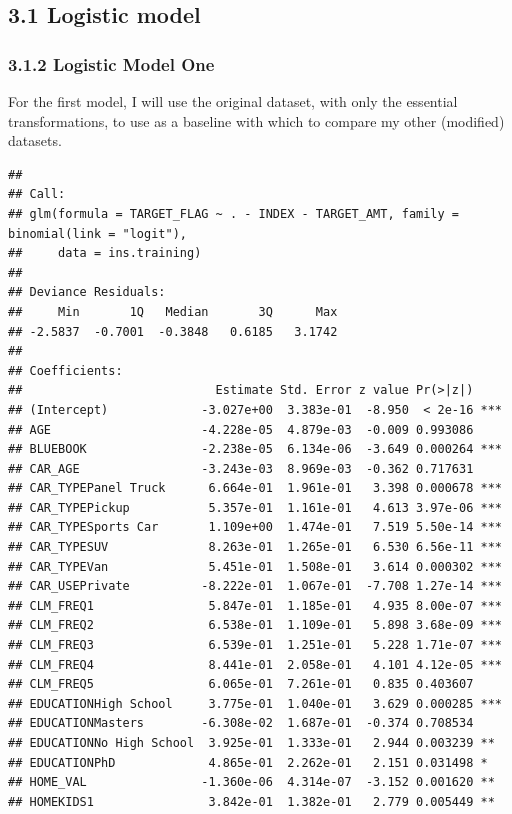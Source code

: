 \documentclass[]{article}
\begin{document}
\subsection{3.1 Logistic model}\label{logistic-model}

\subsubsection{3.1.2 Logistic Model One}\label{logistic-model-one}

For the first model, I will use the original dataset, with only the
essential transformations, to use as a baseline with which to compare my
other (modified) datasets.

\begin{verbatim}
## 
## Call:
## glm(formula = TARGET_FLAG ~ . - INDEX - TARGET_AMT, family = binomial(link = "logit"), 
##     data = ins.training)
## 
## Deviance Residuals: 
##     Min       1Q   Median       3Q      Max  
## -2.5837  -0.7001  -0.3848   0.6185   3.1742  
## 
## Coefficients:
##                           Estimate Std. Error z value Pr(>|z|)    
## (Intercept)             -3.027e+00  3.383e-01  -8.950  < 2e-16 ***
## AGE                     -4.228e-05  4.879e-03  -0.009 0.993086    
## BLUEBOOK                -2.238e-05  6.134e-06  -3.649 0.000264 ***
## CAR_AGE                 -3.243e-03  8.969e-03  -0.362 0.717631    
## CAR_TYPEPanel Truck      6.664e-01  1.961e-01   3.398 0.000678 ***
## CAR_TYPEPickup           5.357e-01  1.161e-01   4.613 3.97e-06 ***
## CAR_TYPESports Car       1.109e+00  1.474e-01   7.519 5.50e-14 ***
## CAR_TYPESUV              8.263e-01  1.265e-01   6.530 6.56e-11 ***
## CAR_TYPEVan              5.451e-01  1.508e-01   3.614 0.000302 ***
## CAR_USEPrivate          -8.222e-01  1.067e-01  -7.708 1.27e-14 ***
## CLM_FREQ1                5.847e-01  1.185e-01   4.935 8.00e-07 ***
## CLM_FREQ2                6.538e-01  1.109e-01   5.898 3.68e-09 ***
## CLM_FREQ3                6.539e-01  1.251e-01   5.228 1.71e-07 ***
## CLM_FREQ4                8.441e-01  2.058e-01   4.101 4.12e-05 ***
## CLM_FREQ5                6.065e-01  7.261e-01   0.835 0.403607    
## EDUCATIONHigh School     3.775e-01  1.040e-01   3.629 0.000285 ***
## EDUCATIONMasters        -6.308e-02  1.687e-01  -0.374 0.708534    
## EDUCATIONNo High School  3.925e-01  1.333e-01   2.944 0.003239 ** 
## EDUCATIONPhD             4.865e-01  2.262e-01   2.151 0.031498 *  
## HOME_VAL                -1.360e-06  4.314e-07  -3.152 0.001620 ** 
## HOMEKIDS1                3.842e-01  1.382e-01   2.779 0.005449 ** 

\end{verbatim}
\end{document}
